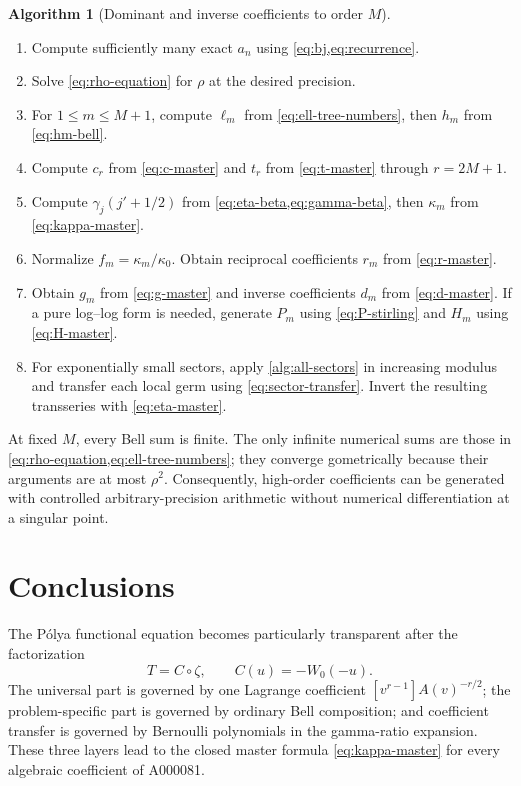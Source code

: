 \documentclass[11pt]{article}
\theoremstyle{definition}
\newtheorem{algorithm}[theorem]{Algorithm}
\theoremstyle{remark}
\begin{document}
\begin{algorithm}[Dominant and inverse coefficients to order $M$]
\label{alg:pipeline}
\begin{enumerate}
\item Compute sufficiently many exact $a_n$ using \cref{eq:bj,eq:recurrence}.
\item Solve \cref{eq:rho-equation} for $\rho$ at the desired precision.
\item For $1\leq m\leq M+1$, compute $\ell_m$ from
      \cref{eq:ell-tree-numbers}, then $h_m$ from \cref{eq:hm-bell}.
\item Compute $c_r$ from \cref{eq:c-master} and $t_r$ from
      \cref{eq:t-master} through $r=2M+1$.
\item Compute $\gamma_j(j'+1/2)$ from
      \cref{eq:eta-beta,eq:gamma-beta}, then $\kappa_m$ from
      \cref{eq:kappa-master}.
\item Normalize $f_m=\kappa_m/\kappa_0$.  Obtain reciprocal coefficients
      $r_m$ from \cref{eq:r-master}.
\item Obtain $g_m$ from \cref{eq:g-master} and inverse coefficients $d_m$
      from \cref{eq:d-master}.  If a pure log--log form is needed, generate
      $P_m$ using \cref{eq:P-stirling} and $H_m$ using
      \cref{eq:H-master}.
\item For exponentially small sectors, apply \cref{alg:all-sectors} in
      increasing modulus and transfer each local germ using
      \cref{eq:sector-transfer}.  Invert the resulting transseries with
      \cref{eq:eta-master}.
\end{enumerate}
\end{algorithm}

At fixed $M$, every Bell sum is finite.  The only infinite numerical sums are
those in \cref{eq:rho-equation,eq:ell-tree-numbers}; they converge
gometrically because their arguments are at most $\rho^2$.  Consequently,
high-order coefficients can be generated with controlled arbitrary-precision
arithmetic without numerical differentiation at a singular point.

\section{Conclusions}

The P\'olya functional equation becomes particularly transparent after the
factorization
\[
 T=C\circ\zeta,
 \qquad C(u)=-W_0(-u).
\]
The universal part is governed by one Lagrange coefficient
$[v^{r-1}]A(v)^{-r/2}$; the problem-specific part is governed by ordinary
Bell composition; and coefficient transfer is governed by Bernoulli
polynomials in the gamma-ratio expansion.  These three layers lead to the
closed master formula \cref{eq:kappa-master} for every algebraic coefficient
of A000081.
\end{document}
